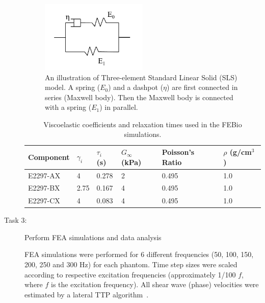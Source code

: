 \begin{description}
    \begin{figure}[htb!]
        \centering
        \includegraphics[width=0.5\textwidth]{figs/sls.png}
        \caption{An illustration of Three-element Standard Linear Solid (SLS)
        model. A spring ($E_0$) and a dashpot ($\eta$) are first connected in
        series (Maxwell body). Then the Maxwell body is connected with a spring
        ($E_1$) in parallel.}
    \label{fig:sls}
    \end{figure}

    \begin{table}
        \centering
        \caption{Viscoelastic coefficients and relaxation times used in the
        FEBio simulations.}
        \label{table:qlv}
        \begin{tabular}{|l|l|l|l|l|l|}
        \hline
        \textbf{Component} & \textbf{$\gamma_i$} & \textbf{$\tau_i$ (s)} & \textbf{$G_\infty$ (kPa)} & \textbf{Poisson's Ratio} & \textbf{$\rho$ (g/cm$^3$)}\\
        \hline
        E2297-AX & 4 & 0.278 & 2 & 0.495 & 1.0 \\
        E2297-BX & 2.75 & 0.167 & 4 & 0.495 & 1.0 \\
        E2297-CX & 4 & 0.083 & 4 & 0.495 & 1.0 \\
        \hline
        \end{tabular}
    \end{table}

    \item[Task 3:] Perform FEA simulations and data analysis

    FEA simulations were performed for 6 different frequencies (50, 100, 150,
    200, 250 and 300 Hz) for each phantom. Time step sizes were scaled
    according to respective excitation frequencies (approximately 1/100 $f$,
    where $f$ is the excitation frequency). All shear wave (phase) velocities
    were estimated by a lateral TTP algorithm~\cite{Palmeri2008}.  

\end{description}


